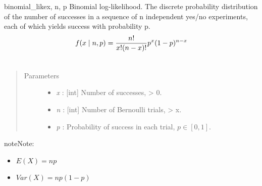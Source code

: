 \hypertarget{pymc.distributions.binomial_like}{}\begin{funcdesc}{binomial\_like}{x, n, p}
Binomial log-likelihood.  The discrete probability distribution of the
number of successes in a sequence of n independent yes/no experiments,
each of which yields success with probability p.
\begin{gather}
\begin{split}f(x \mid n, p) = \frac{n!}{x!(n-x)!} p^x (1-p)^{n-x}\end{split}\notag\\\begin{split}\end{split}\notag
\end{gather}\begin{quote}\begin{description}
\item[Parameters] \leavevmode\begin{itemize}
\item {} 
\emph{x} : {[}int{]} Number of successes, \textgreater{} 0.

\item {} 
\emph{n} : {[}int{]} Number of Bernoulli trials, \textgreater{} x.

\item {} 
\emph{p} : Probability of success in each trial, $p \in [0,1]$.

\end{itemize}

\end{description}\end{quote}

\begin{notice}{note}{Note:}\begin{itemize}
\item {} 
$E(X)=np$

\item {} 
$Var(X)=np(1-p)$

\end{itemize}
\end{notice}
\end{funcdesc}

